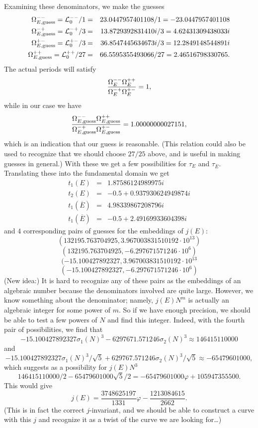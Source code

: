 Examining these denominators, we make the guesses
\begin{eqnarray*}
    \Omega^{--}_{E, \textrm{guess}} = \mathcal{L}^{--}_0 / 1 &=& 23.0447957401108/1 = -23.0447957401108 \\
    \Omega^{-+}_{E, \textrm{guess}} = \mathcal{L}^{-+}_0 / 3 &=& 13.8729392831410i/3 = 4.62431309438033i \\
    \Omega^{+-}_{E, \textrm{guess}} = \mathcal{L}^{+-}_0 / 3 &=& 36.8547445634673i/3 = 12.2849148544891i \\
    \Omega^{++}_{E, \textrm{guess}} = \mathcal{L}^{++}_0 / 27 &=& 66.5595355493066/27 = 2.46516798330765.
\end{eqnarray*}
The actual periods will satisfy
\[
    \frac{\Omega^{--}_E \Omega^{++}_E}{\Omega^{-+}_E \Omega^{+-}_E} = 1,
\]
while in our case we have
\[
    \frac{\Omega^{--}_{E,\text{guess}} \Omega^{++}_{E, \text{guess}}}{\Omega^{-+}_{E, \text{guess}} \Omega^{+-}_{E,\text{guess}}} = 1.00000000027151,
\]
which is an indication that our guess is reasonable. (This relation could also be used to recognize that we
should choose $27/25$ above, and is useful in making guesses in general.) With these we get a few possibilities
for $\tau_E$ and $\tau_{\overline E}$. Translating these into the fundamental domain we get
\begin{eqnarray}
    t_1(E) &=& 1.87586124989975i \\
    t_2(E) &=& -0.5 + 0.937930624949874i \\
    t_1(\overline E) &=& 4.98339867208796i \\
    t_1(\overline E) &=& -0.5 + 2.49169933604398i
\end{eqnarray}
and $4$ corresponding pairs of guesses for the embeddings of $j(E)$:
\[
(132195.763704925, 3.967003831510192 \cdot 10^{13})
\]
\[
(132195.763704925, -6.297671571246 \cdot 10^{6} )
\]
\[
(-15.100427892327, 3.967003831510192 \cdot 10^{13}
\]
\[
(-15.100427892327, -6.297671571246 \cdot 10^{6} )
\]
(New idea:) It is hard to recognize any of these pairs as the embeddings of an algebraic number because the
denominators involved are quite large. However, we know something about the denominator; namely, $j(E)N^m$
is actually an algebraic integer for some power of $m$. So if we have enough precision, we should be able
to test a few powers of $N$ and find this integer. Indeed, with the fourth pair of possibilities, we find
that
\[
     -15.100427892327 \sigma_1(N)^3 -6297671.571246 \sigma_2(N)^3 \approx 146415110000
\]
and
\[
     -15.100427892327 \sigma_1(N)^3/\sqrt{5} + 629767.571246 \sigma_2(N)^3/\sqrt{5} \approx -65479601000,
\]
which suggests as a possibility for $j(E) N^3$
\[
    146415110000/2 - 65479601000\sqrt{5}/2 = -65479601000\varphi + 105947355500.
\]
This would give
\[
    j(E) = \frac{3748625197}{1331} \varphi - \frac{1213084615}{2662}.
\]
(This is in fact the correct $j$-invariant, and we should be able to construct a curve with this $j$
and recognize it as a twist of the curve we are looking for\ldots)
